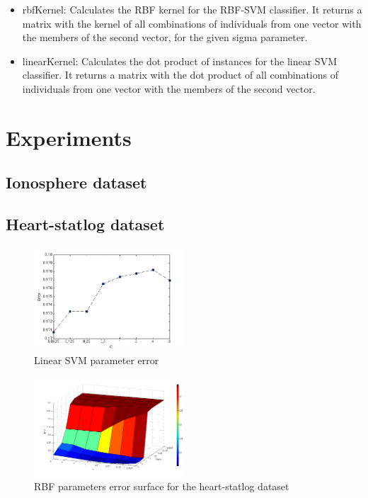\documentclass[10pt, journal]{IEEEtran}
\begin{document}
\begin{itemize}
\item rbfKernel: Calculates the RBF kernel for the RBF-SVM classifier. It returns a matrix with the kernel of all combinations of individuals from one vector with the members of the second vector, for the given sigma parameter.
\item linearKernel: Calculates the dot product of instances for the linear SVM classifier. It returns a matrix with the dot product of all combinations of individuals from one vector with the members of the second vector.
\end{itemize}



\section{Experiments} %
\label{sec:experiments}

\subsection{Ionosphere dataset} %
\label{sub:ionosphere_dataset}


\subsection{Heart-statlog dataset} %
\label{sub:heart_statlog_dataset}

\begin{figure}[ht!]
	\centering
	\includegraphics[width=0.5\textwidth]{img/errorSVMHeartLog}
	\caption{Linear SVM parameter error}
	\label{fig:errorSVMHeartLog}
\end{figure}


\begin{figure}[ht!]
	\centering
	\includegraphics[width=0.5\textwidth]{img/errorSurfaceHeartStatLog}
	\caption{RBF parameters error surface for the heart-statlog dataset}
	\label{fig:errorSurfaceHeartStatLog}
\end{figure}
\end{document}
